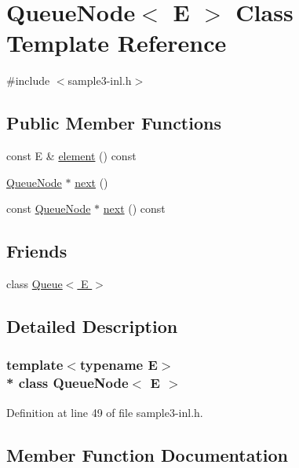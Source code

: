 \hypertarget{class_queue_node}{}\section{Queue\+Node$<$ E $>$ Class Template Reference}
\label{class_queue_node}


{\ttfamily \#include $<$sample3-\/inl.\+h$>$}

\subsection*{Public Member Functions}
\begin{DoxyCompactItemize}
\item 
const E \& \hyperlink{class_queue_node_a0a51093418d7aefcfc2876bfe217b0fc}{element} () const 
\item 
\hyperlink{class_queue_node}{Queue\+Node} $\ast$ \hyperlink{class_queue_node_a8a9fdf488da06533360999ef85db56ea}{next} ()
\item 
const \hyperlink{class_queue_node}{Queue\+Node} $\ast$ \hyperlink{class_queue_node_a220a47895c5ccc0fb9ae3ef73cfe2512}{next} () const 
\end{DoxyCompactItemize}
\subsection*{Friends}
\begin{DoxyCompactItemize}
\item 
class \hyperlink{class_queue_node_ad4336229b1d7c3626e4ba69f236b202d}{Queue$<$ E $>$}
\end{DoxyCompactItemize}


\subsection{Detailed Description}
\subsubsection*{template$<$typename E$>$\\*
class Queue\+Node$<$ E $>$}



Definition at line 49 of file sample3-\/inl.\+h.



\subsection{Member Function Documentation}
